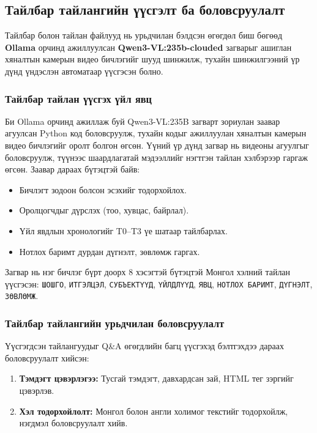 \subsection{Тайлбар тайлангийн үүсгэлт ба боловсруулалт}

Тайлбар болон тайлан файлууд нь урьдчилан бэлдсэн өгөгдөл биш бөгөөд \textbf{Ollama} орчинд ажиллуулсан \textbf{Qwen3-VL:235b-clouded} загварыг ашиглан хяналтын камерын видео бичлэгийг шууд шинжилж, тухайн шинжилгээний үр дүнд үндэслэн автоматаар үүсгэсэн болно.

\subsubsection*{Тайлбар тайлан үүсгэх үйл явц}

Би Ollama орчинд ажиллаж буй Qwen3-VL:235B загварт зориулан заавар агуулсан Python код боловсруулж, тухайн кодыг ажиллуулан хяналтын камерын видео бичлэгийг оролт болгон өгсөн. Үүний үр дүнд загвар нь видеоны агуулгыг боловсруулж, түүнээс шаардлагатай мэдээллийг нэгтгэн тайлан хэлбэрээр гаргаж өгсөн. Заавар дараах бүтэцтэй байв:

\begin{itemize}
    \item Бичлэгт зодоон болсон эсэхийг тодорхойлох.
    \item Оролцогчдыг дүрслэх (тоо, хувцас, байрлал).
    \item Үйл явдлын хронологийг T0–T3 үе шатаар тайлбарлах.
    \item Нотлох баримт дурдан дүгнэлт, зөвлөмж гаргах.
\end{itemize}

Загвар нь нэг бичлэг бүрт доорх 8 хэсэгтэй бүтэцтэй Монгол хэлний тайлан үүсгэсэн:
\texttt{ШОШГО}, \texttt{ИТГЭЛЦЭЛ}, \texttt{СУБЪЕКТҮҮД}, \texttt{ҮЙЛДЛҮҮД}, \texttt{ЯВЦ}, \texttt{НОТЛОХ БАРИМТ}, \texttt{ДҮГНЭЛТ}, \texttt{ЗӨВЛӨМЖ}.

\subsubsection*{Тайлбар тайлангийн урьдчилан боловсруулалт}

Үүсгэгдсэн тайлангуудыг Q\&A өгөгдлийн багц үүсгэхэд бэлтгэхдээ дараах боловсруулалт хийсэн:

\begin{enumerate}
    \item \textbf{Тэмдэгт цэвэрлэгээ:} Тусгай тэмдэгт, давхардсан зай, HTML тег зэргийг цэвэрлэв.

    \item \textbf{Хэл тодорхойлолт:} Монгол болон англи холимог текстийг тодорхойлж, нэгдмэл боловсруулалт хийв.
\end{enumerate}


